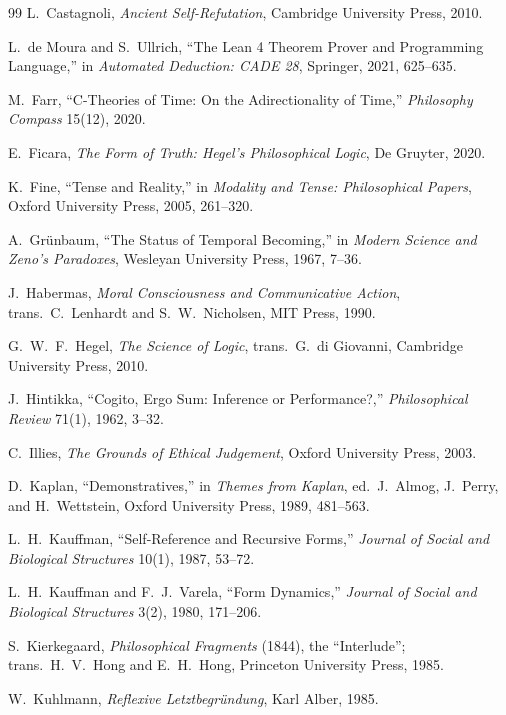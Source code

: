 \documentclass[11pt]{article}
\begin{document}
\begin{thebibliography}{99}
 L.\ Castagnoli, \emph{Ancient Self-Refutation},
Cambridge University Press, 2010.

 L.\ de Moura and S.\ Ullrich, ``The Lean 4 Theorem Prover
and Programming Language,'' in \emph{Automated Deduction: CADE 28}, Springer,
2021, 625--635.

 M.\ Farr, ``C-Theories of Time: On the Adirectionality of
Time,'' \emph{Philosophy Compass} 15(12), 2020.

 E.\ Ficara, \emph{The Form of Truth: Hegel's Philosophical
Logic}, De Gruyter, 2020.

 K.\ Fine, ``Tense and Reality,'' in \emph{Modality and
Tense: Philosophical Papers}, Oxford University Press, 2005, 261--320.

 A.\ Gr\"unbaum, ``The Status of Temporal Becoming,'' in
\emph{Modern Science and Zeno's Paradoxes}, Wesleyan University Press, 1967,
7--36.

 J.\ Habermas, \emph{Moral Consciousness and
Communicative Action}, trans.\ C.\ Lenhardt and S.\ W.\ Nicholsen, MIT Press,
1990.

 G.\ W.\ F.\ Hegel, \emph{The Science of Logic}, trans.\
G.\ di Giovanni, Cambridge University Press, 2010.

 J.\ Hintikka, ``Cogito, Ergo Sum: Inference or
Performance?,'' \emph{Philosophical Review} 71(1), 1962, 3--32.

 C.\ Illies, \emph{The Grounds of Ethical Judgement},
Oxford University Press, 2003.

 D.\ Kaplan, ``Demonstratives,'' in \emph{Themes from
Kaplan}, ed.\ J.\ Almog, J.\ Perry, and H.\ Wettstein, Oxford University Press,
1989, 481--563.

 L.\ H.\ Kauffman, ``Self-Reference and Recursive Forms,''
\emph{Journal of Social and Biological Structures} 10(1), 1987, 53--72.

 L.\ H.\ Kauffman and F.\ J.\ Varela, ``Form
Dynamics,'' \emph{Journal of Social and Biological Structures} 3(2), 1980,
171--206.

 S.\ Kierkegaard, \emph{Philosophical Fragments}
(1844), the ``Interlude''; trans.\ H.\ V.\ Hong and E.\ H.\ Hong, Princeton
University Press, 1985.

 W.\ Kuhlmann, \emph{Reflexive Letztbegr\"undung}, Karl
Alber, 1985.


\end{thebibliography}
\end{document}
